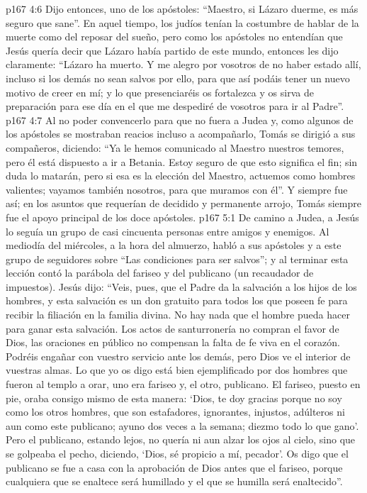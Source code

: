 \vs p167 4:6 Dijo entonces, uno de los apóstoles: “Maestro, si Lázaro duerme, es más seguro que sane”. En aquel tiempo, los judíos tenían la costumbre de hablar de la muerte como del reposar del sueño, pero como los apóstoles no entendían que Jesús quería decir que Lázaro había partido de este mundo, entonces les dijo claramente: “Lázaro ha muerto. Y me alegro por vosotros de no haber estado allí, incluso si los demás no sean salvos por ello, para que así podáis tener un nuevo motivo de creer en mí; y lo que presenciaréis os fortalezca y os sirva de preparación para ese día en el que me despediré de vosotros para ir al Padre”.
\vs p167 4:7 Al no poder convencerlo para que no fuera a Judea y, como algunos de los apóstoles se mostraban reacios incluso a acompañarlo, Tomás se dirigió a sus compañeros, diciendo: “Ya le hemos comunicado al Maestro nuestros temores, pero él está dispuesto a ir a Betania. Estoy seguro de que esto significa el fin; sin duda lo matarán, pero si esa es la elección del Maestro, actuemos como hombres valientes; vayamos también nosotros, para que muramos con él”. Y siempre fue así; en los asuntos que requerían de decidido y permanente arrojo, Tomás siempre fue el apoyo principal de los doce apóstoles.
\vs p167 5:1 De camino a Judea, a Jesús lo seguía un grupo de casi cincuenta personas entre amigos y enemigos. Al mediodía del miércoles, a la hora del almuerzo, habló a sus apóstoles y a este grupo de seguidores sobre “Las condiciones para ser salvos”; y al terminar esta lección contó la parábola del fariseo y del publicano (un recaudador de impuestos). Jesús dijo: “Veis, pues, que el Padre da la salvación a los hijos de los hombres, y esta salvación es un don gratuito para todos los que poseen fe para recibir la filiación en la familia divina. No hay nada que el hombre pueda hacer para ganar esta salvación. Los actos de santurronería no compran el favor de Dios, las oraciones en público no compensan la falta de fe viva en el corazón. Podréis engañar con vuestro servicio ante los demás, pero Dios ve el interior de vuestras almas. Lo que yo os digo está bien ejemplificado por dos hombres que fueron al templo a orar, uno era fariseo y, el otro, publicano. El fariseo, puesto en pie, oraba consigo mismo de esta manera: ‘Dios, te doy gracias porque no soy como los otros hombres, que son estafadores, ignorantes, injustos, adúlteros ni aun como este publicano; ayuno dos veces a la semana; diezmo todo lo que gano’. Pero el publicano, estando lejos, no quería ni aun alzar los ojos al cielo, sino que se golpeaba el pecho, diciendo, ‘Dios, sé propicio a mí, pecador’. Os digo que el publicano se fue a casa con la aprobación de Dios antes que el fariseo, porque cualquiera que se enaltece será humillado y el que se humilla será enaltecido”.
